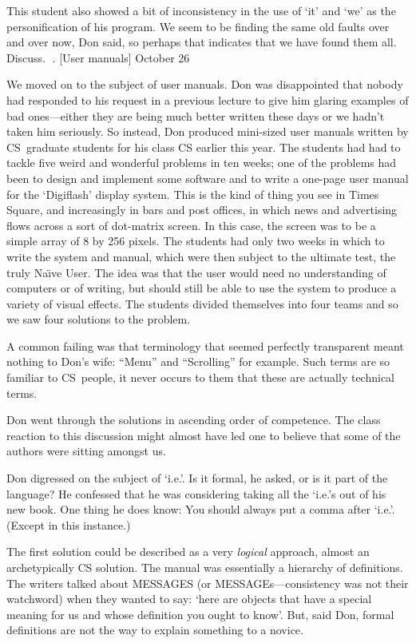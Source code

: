 This student also showed a bit of inconsistency in the use of `it'
and `we' as the personification of his program. We seem to be
finding the same old faults over and over now, Don said, so perhaps
that indicates that we have found them all. Discuss.
. [User manuals] \pmr October 26

We moved  on to the subject of user manuals. Don was disappointed that
nobody had responded to his request in a previous lecture
to give him glaring examples of bad ones---either they are
being much better written these days or we hadn't taken him seriously.
So instead, Don produced mini-sized user manuals written by
CS~graduate students for his class CS earlier this year. The
students had had to tackle five weird and wonderful problems in ten weeks;
 one of the problems had been to design and implement some
software and to write a one-page user manual for the `Digiflash'
display system. This is the kind of thing you see in Times Square,
and increasingly in bars and post offices, in which news and advertising
flows across a sort of dot-matrix screen. In this case, the screen
was to be a simple array of 8 by 256 pixels. The students had only
two weeks in which to write the system and manual, which were then subject
to the ultimate test, the truly {Na\"\i ve} User. The idea was that
the user would need no understanding of computers or of writing,
but should still be able to use the system to produce a variety of
visual effects. The students divided themselves into four teams and
so we saw four solutions to the problem.

A common failing was that terminology that seemed perfectly transparent
meant nothing to Don's wife: ``Menu'' and ``Scrolling'' for example.
Such terms are so familiar to CS~people, it never occurs to them that
these are actually technical terms.

Don went through the solutions in ascending order of competence. The
class reaction to this discussion might almost have led one to believe
that some of the authors were sitting amongst us.

Don digressed on the subject of `i.e.'. Is it formal, he asked, or is
it part of the language? He confessed that he was considering taking
all the `i.e.'s out of his new book. One thing he does know: You should
always put a comma after `i.e.'. (Except in this instance.)

The first solution could be described as a very {\it logical\/} approach,
almost an archetypically CS solution. The manual was essentially
a hierarchy of definitions. The writers talked about MESSAGES (or
MESSAGEs---consistency was not their watchword) when they wanted
to say: `here are objects that have a special meaning for us and
whose definition you ought to know'. But, said Don, formal
definitions are not the way to explain something to a novice. 

